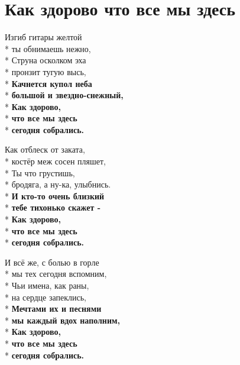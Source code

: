 \vspace{\fill}\newpage

\section{Как здорово что все мы здесь}
\label{song:Как_здорово_что_все_мы_здесь}

\medskip

\begin{minipage}{\linewidth}
Изгиб гитары желтой\\*
ты обнимаешь нежно,\\*
Струна осколком эха\\*
пронзит тугую высь,\\*
\textbf{Качнется купол неба}\\*
\textbf{большой и звездно-снежный,}\\*
\textbf{Как здорово,}\\*
\textbf{что все мы здесь}\\*
\textbf{сегодня собрались.}\\
\end{minipage}\par\medskip\nobreak

\medskip

\begin{minipage}{\linewidth}
Как отблеск от заката,\\*
костёр меж сосен пляшет,\\*
Ты что грустишь,\\*
бродяга, а ну-ка, улыбнись.\\*
\textbf{И кто-то очень близкий}\\*
\textbf{тебе тихонько скажет -}\\*
\textbf{Как здорово,}\\*
\textbf{что все мы здесь}\\*
\textbf{сегодня собрались.}\\
\end{minipage}\par\medskip\nobreak

\medskip

\begin{minipage}{\linewidth}
И всё же, с болью в горле\\*
мы тех сегодня вспомним,\\*
Чьи имена, как раны,\\*
на сердце запеклись,\\*
\textbf{Мечтами их и песнями}\\*
\textbf{мы каждый вдох наполним,}\\*
\textbf{Как здорово,}\\*
\textbf{что все мы здесь}\\*
\textbf{сегодня собрались.}\\
\end{minipage}\par\medskip\nobreak

